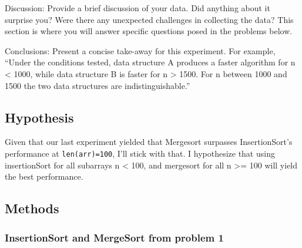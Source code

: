 \documentclass[11pt]{article}
\begin{document}
Discussion: Provide a brief discussion of your data. Did anything about
it surprise you? Were there any unexpected challenges in collecting the
data? This section is where you will answer specific questions posed in
the problems below.

Conclusions: Present a concise take-away for this experiment. For
example, ``Under the conditions tested, data structure A produces a
faster algorithm for n \textless{} 1000, while data structure B is
faster for n \textgreater{} 1500. For n between 1000 and 1500 the two
data structures are indistinguishable.''

    \subsection{Hypothesis}\label{hypothesis}

Given that our last experiment yielded that Mergesort surpasses
InsertionSort's performance at \texttt{len(arr)=100}, I'll stick with
that. I hypothesize that using insertionSort for all subarrays n
\textless{} 100, and mergesort for all n \textgreater{}= 100 will yield
the best performance.

    \subsection{Methods}\label{methods}

\subsubsection{InsertionSort and MergeSort from problem
1}\label{insertionsort-and-mergesort-from-problem-1}
\end{document}
